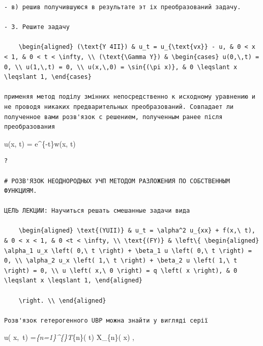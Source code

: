 \documentclass[
  ukrainian,
]{article}
\begin{document}
\begin{verbatim}
- в) решив получившуюся в результате эт іх преобразований задачу.

- 3. Решите задачу

    \begin{aligned} (\text{Y 4II}) & u_t = u_{\text{vx}} - u, & 0 < x < 1, & 0 < t < \infty, \\ (\text{\Gamma Y}) & \begin{cases} u(0,\,t) = 0, \\ u(1,\,t) = 0, \\ u(x,\,0) = \sin{(\pi x)}, & 0 \leqslant x \leqslant 1, \end{cases}

применяя метод поділу змінних непосредственно к исходному уравнению и не проводя никаких предварительных преобразований. Совпадает ли полученное вами розв'язок с решением, полученным ранее після преобразования
\end{verbatim}

u(x, t) = e\^{}\{-t\}w(x, t)

\begin{verbatim}
?

# РОЗВ'ЯЗОК НЕОДНОРОДНЫХ УЧП МЕТОДОМ РАЗЛОЖЕНИЯ ПО СОБСТВЕННЫМ ФУНКЦИЯМ.

ЦЕЛЬ ЛЕКЦИИ: Научиться решать смешанные задачи вида

    \begin{aligned} \text{(YUII)} & u_t = \alpha^2 u_{xx} + f(x,\ t), & 0 < x < 1, & 0 <t < \infty, \\ \text{(FY)} & \left\{ \begin{aligned} \alpha_1 u_x \left( 0,\ t \right) + \beta_1 u \left( 0,\ t \right) = 0, \\ \alpha_2 u_x \left( 1,\ t \right) + \beta_2 u \left( 1,\ t \right) = 0, \\ u \left( x,\ 0 \right) = q \left( x \right), & 0 \leqslant x \leqslant 1, \end{aligned}

    \right. \\ \end{aligned}

Розв'язок гетерогенного UBP можна знайти у вигляді серії
\end{verbatim}

u\left( x,~t\right) =\sum\emph{\{n=1\}\^{}\{\infty\}T}\{n\}\left(
t\right) X\_\{n\}\left( x\right) ,
\end{document}
